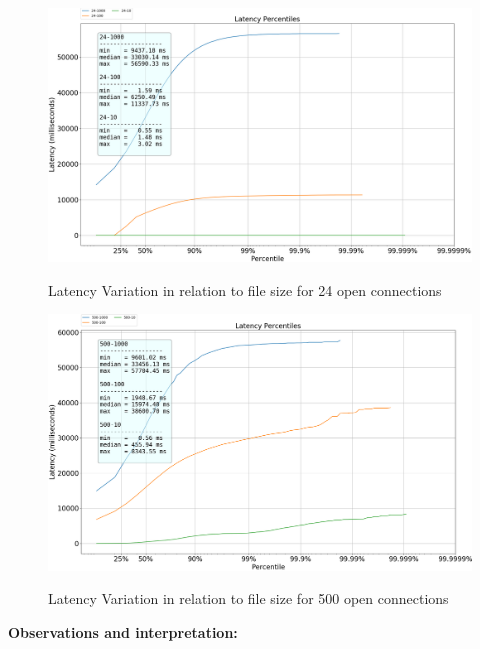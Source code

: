\documentclass[runningheads]{llncs}
\begin{document}
\begin{figure}
    \centering
    \begin{minipage}{0.49\textwidth}
        \centering
        \includegraphics[width=1\textwidth]{plotcon24.png}\vspace{-1em}
        \caption{Latency Variation in relation to file size for 24 open connections}\vspace{-1.5em}
		\label {fig:latency-to-size-24}
    \end{minipage}\hfill
    \begin{minipage}{0.49\textwidth}
        \centering
        \includegraphics[width=1\textwidth]{plotcon500.png}\vspace{-1em}
        \caption{Latency Variation in relation to file size for 500 open connections}\vspace{-1.5em}
		\label {fig:latency-to-size-500}
    \end{minipage}
\end{figure}
\textbf{Observations and interpretation:}
\end{document}

